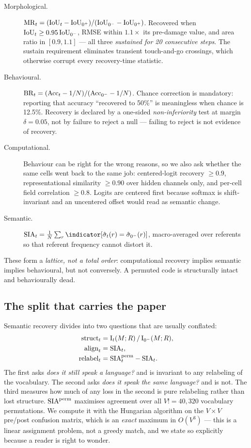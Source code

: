 \begin{description}
\item[Morphological.]
  $\mathrm{MR}_t = (\mathrm{IoU}_t - \mathrm{IoU}_{0^{+}})/(\mathrm{IoU}_{0^{-}} - \mathrm{IoU}_{0^{+}})$. Recovered when
  $\mathrm{IoU}_t \geq 0.95\,\mathrm{IoU}_{0^{-}}$, RMSE within $1.1\times$ its pre-damage value,
  and area ratio in $[0.9, 1.1]$ --- all three \emph{sustained for 20
  consecutive steps}. The sustain requirement eliminates transient touch-and-go
  crossings, which otherwise corrupt every recovery-time statistic.

\item[Behavioural.]
  $\mathrm{BR}_t = (\mathrm{Acc}_t - 1/N)/(\mathrm{Acc}_{0^{-}} - 1/N)$. Chance correction
  is mandatory: reporting that accuracy ``recovered to 50\%'' is meaningless when
  chance is 12.5\%. Recovery is declared by a one-sided \emph{non-inferiority}
  test at margin $\delta = 0.05$, not by failure to reject a null --- failing to
  reject is not evidence of recovery.

\item[Computational.] Behaviour can be right for the wrong reasons, so we also
  ask whether the same cells went back to the same job: centered-logit recovery
  $\geq 0.9$, representational similarity $\geq 0.90$ over hidden channels only,
  and per-cell field correlation $\geq 0.8$. Logits are centered first because
  softmax is shift-invariant and an uncentered offset would read as semantic
  change.

\item[Semantic.]
  $\SIA_t = \frac{1}{N}\sum_r \indicator[\hat\sigma_t(r) = \hat\sigma_\dmg(r)]$,
  macro-averaged over referents so that referent frequency cannot distort it.
\end{description}

These form a \emph{lattice, not a total order}: computational recovery implies
semantic implies behavioural, but not conversely. A permuted code is structurally
intact and behaviourally dead.

\subsection{The split that carries the paper}

Semantic recovery divides into two questions that are usually conflated:
%
\begin{align}
  \mathrm{struct}_t  &= \mathrm{I}_t(M;R) \,/\, \mathrm{I}_{0^{-}}(M;R), \\
  \mathrm{align}_t   &= \mathrm{SIA}_t, \\
  \mathrm{relabel}_t &= \mathrm{SIA}^{\mathrm{perm}}_t - \mathrm{SIA}_t .
\end{align}
%
The first asks \emph{does it still speak a language?} and is invariant to any
relabeling of the vocabulary. The second asks \emph{does it speak the same
language?} and is not. The third measures how much of any loss in the second is
pure relabeling rather than lost structure.
%
$\mathrm{SIA}^{\mathrm{perm}}$ maximises agreement over all $V! = 40{,}320$ vocabulary
permutations. We compute it with the Hungarian algorithm on the $V\times V$
pre/post confusion matrix, which is an \emph{exact} maximum in $O(V^3)$ --- this
is a linear assignment problem, not a greedy match, and we state so explicitly
because a reader is right to wonder.

